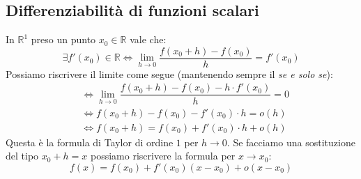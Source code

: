 \subsection{Differenziabilità di funzioni scalari}
In $\mathbb{R}^1$ preso un punto $x_0 \in \mathbb{R}$ vale che:
\begin{equation*}
	\exists f'(x_0) \in \mathbb{R} \iff \lim_{h \to 0} \dfrac{f(x_0 + h) - 
	f(x_0)}{h} = f'(x_0)
\end{equation*}
Possiamo riscrivere il limite come segue (mantenendo sempre il \textit{se e 
solo se}):
\begin{align*}
	&\iff \lim_{h \to 0} \dfrac{f(x_0 + h) - f(x_0) - h \cdot f'(x_0)}{h} 
	= 0\\[5pt]
	&\iff f(x_0 + h) - f(x_0) - f'(x_0) \cdot h = o(h)\\[5pt]
	&\iff f(x_0 + h) = f(x_0) + f'(x_0) \cdot h + o(h)
\end{align*}
Questa è la formula di Taylor di ordine $1$ per $h \to 0$. Se facciamo una 
sostituzione del tipo $x_0 + h = x$ possiamo riscrivere la formula per 
$x \to x_0$:
\begin{equation*}
	f(x) = f(x_0) + f'(x_0) (x - x_0) + o(x - x_0)
\end{equation*}

